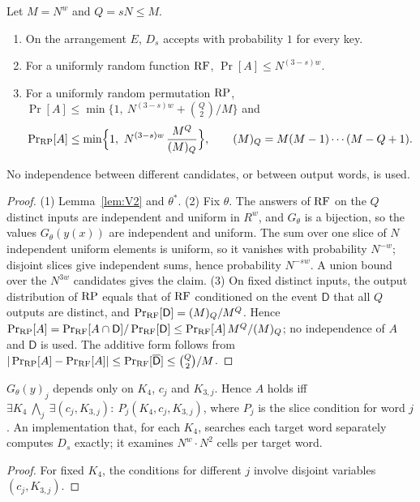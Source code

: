\begin{theorem}\label{thm:V}
Let $M=N^w$ and $Q=sN\le M$.
\begin{enumerate}
\item On the arrangement $E$, $D_s$ accepts with probability $1$ for every key.
\item For a uniformly random function $\mathrm{RF}$, $\Pr[A]\le N^{(3-s)w}$.
\item For a uniformly random permutation $\mathrm{RP}$, $\Pr[A]\le\min\{1,\ N^{(3-s)w}+\binom{Q}{2}/M\}$ and
\[
\Pr\nolimits_{\RP}[A]\le\min\Bigl\{1,\ N^{(3-s)w}\,\frac{M^Q}{(M)_Q}\Bigr\},\qquad (M)_Q=M(M-1)\cdots(M-Q+1).
\]
\end{enumerate}
No independence between different candidates, or between output words, is used.
\end{theorem}
\begin{proof}
(1) Lemma~\ref{lem:V2} and $\theta^*$.
(2) Fix $\theta$. The answers of $\mathrm{RF}$ on the $Q$ distinct inputs are independent and uniform in $R^w$, and
$G_\theta$ is a bijection, so the values $G_\theta(y(x))$ are independent and uniform. The sum over one slice
of $N$ independent uniform elements is uniform, so it vanishes with probability $N^{-w}$; disjoint slices
give independent sums, hence probability $N^{-sw}$. A union bound over the $N^{3w}$ candidates gives the claim.
(3) On fixed distinct inputs, the output distribution of $\mathrm{RP}$ equals that of $\mathrm{RF}$ conditioned on the event
$\mathsf D$ that all $Q$ outputs are distinct, and $\Pr_{\mathrm{RF}}[\mathsf D]=(M)_Q/M^Q$. Hence
$\Pr_{\mathrm{RP}}[A]=\Pr_{\mathrm{RF}}[A\cap\mathsf D]/\Pr_{\mathrm{RF}}[\mathsf D]\le\Pr_{\mathrm{RF}}[A]\,M^Q/(M)_Q$; no independence of $A$ and
$\mathsf D$ is used. The additive form follows from $|\Pr_{\mathrm{RP}}[A]-\Pr_{\mathrm{RF}}[A]|\le\Pr_{\mathrm{RF}}[\overline{\mathsf D}]\le\binom Q2/M$.
\end{proof}

\begin{proposition}\label{prop:dec}
$G_\theta(y)_j$ depends only on $K_4$, $c_j$ and $K_{3,j}$. Hence $A$ holds iff
$\exists K_4\ \bigwedge_j\ \exists(c_j,K_{3,j}):\ P_j(K_4,c_j,K_{3,j})$, where $P_j$ is the slice condition for
word $j$. An implementation that, for each $K_4$, searches each target word separately computes $D_s$
exactly; it examines $N^{w}\cdot N^{2}$ cells per target word.
\end{proposition}
\begin{proof}
For fixed $K_4$, the conditions for different $j$ involve disjoint variables $(c_j,K_{3,j})$.
\end{proof}

